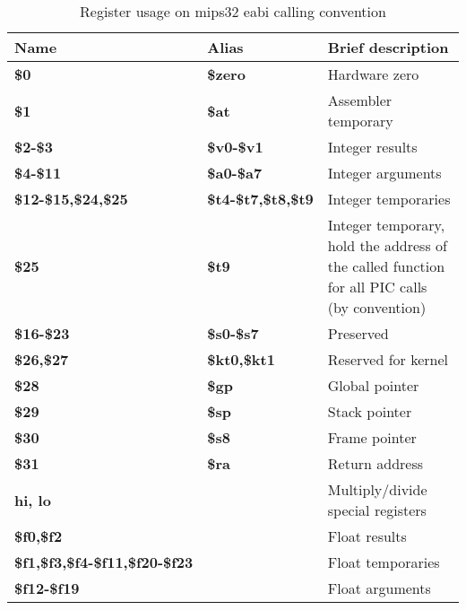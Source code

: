 \begin{table}[h]
\begin{tabular}{lll}
\hline
Name                                   & Alias                     & Brief description\\
\hline                                                             
{\bf \$0}                              & {\bf \$zero}              & Hardware zero \\
{\bf \$1}                              & {\bf \$at}                & Assembler temporary \\
{\bf \$2-\$3}                          & {\bf \$v0-\$v1}           & Integer results \\
{\bf \$4-\$11}                         & {\bf \$a0-\$a7}           & Integer arguments\\
{\bf \$12-\$15,\$24,\$25}              & {\bf \$t4-\$t7,\$t8,\$t9} & Integer temporaries \\
{\bf \$25}                             & {\bf \$t9}                & Integer temporary, hold the address of the called function for all PIC calls (by convention) \\
{\bf \$16-\$23}                        & {\bf \$s0-\$s7}           & Preserved \\
{\bf \$26,\$27}                        & {\bf \$kt0,\$kt1}         & Reserved for kernel \\
{\bf \$28}                             & {\bf \$gp}                & Global pointer \\
{\bf \$29}                             & {\bf \$sp}                & Stack pointer \\
{\bf \$30}                             & {\bf \$s8}                & Frame pointer \\
{\bf \$31}                             & {\bf \$ra}                & Return address \\
{\bf hi, lo}                           &                           & Multiply/divide special registers \\
{\bf \$f0,\$f2}                        &                           & Float results \\
{\bf \$f1,\$f3,\$f4-\$f11,\$f20-\$f23} &                           & Float temporaries \\
{\bf \$f12-\$f19}                      &                           & Float arguments \\
\end{tabular}
\caption{Register usage on mips32 eabi calling convention}
\end{table}

